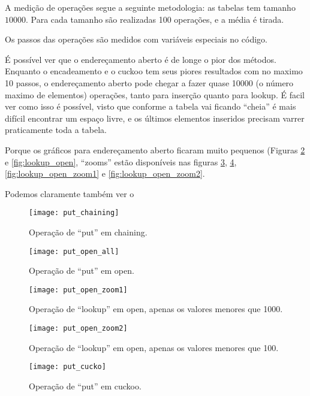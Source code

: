 \documentclass{article}
\begin{document}
A medição de operações segue a seguinte metodologia: as tabelas tem tamanho $10000$. Para cada
tamanho são realizadas 100 operações, e a média é tirada.

Os passos das operações são medidos com variáveis especiais no código.

É possível ver que o endereçamento aberto é de longe o pior dos métodos. Enquanto o encadeamento e
o cuckoo tem seus piores resultados com no maximo 10 passos, o endereçamento aberto pode chegar a
fazer quase 10000 (o número maximo de elementos) operações, tanto para inserção quanto para lookup.
É facil ver como isso é possível, visto que conforme a tabela vai ficando ``cheia'' é mais difícil
encontrar um espaço livre, e os últimos elementos inseridos precisam varrer praticamente toda a
tabela.

Porque os gráficos para endereçamento aberto ficaram muito pequenos (Figuras \ref{fig:put_open} e
\ref{fig:lookup_open}, ``zooms'' estão disponíveis nas figuras \ref{fig:put_open_zoom1},
\ref{fig:put_open_zoom2}, \ref{fig:lookup_open_zoom1} e \ref{fig:lookup_open_zoom2}.

Podemos claramente também ver o

\begin{figure}
  \centering
  \texttt{[image: put\_chaining]}
  \caption{Operação de ``put'' em chaining.}
  \label{fig:put_chaining}
\end{figure}

\begin{figure}
  \centering
  \texttt{[image: put\_open\_all]}
  \caption{Operação de ``put'' em open.}
  \label{fig:put_open}
\end{figure}

\begin{figure}
  \centering
  \texttt{[image: put\_open\_zoom1]}
  \caption{Operação de ``lookup'' em open, apenas os valores menores que 1000.}
  \label{fig:put_open_zoom1}
\end{figure}

\begin{figure}
  \centering
  \texttt{[image: put\_open\_zoom2]}
  \caption{Operação de ``lookup'' em open, apenas os valores menores que 100.}
  \label{fig:put_open_zoom2}
\end{figure}

\begin{figure}
  \centering
  \texttt{[image: put\_cucko]}
  \caption{Operação de ``put'' em cuckoo.}
  \label{fig:put_cuckoo}
\end{figure}
\end{document}
